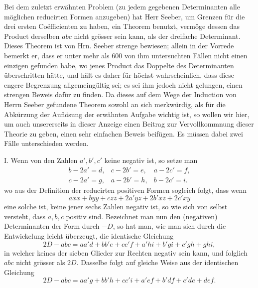 \documentclass[12pt]{article}
\begin{document}
Bei dem zuletzt erwähnten Problem (zu jedem gegebenen Determinanten alle möglichen reducirten Formen anzugeben) hat Herr Seeber, um Grenzen für die drei ersten Coëfficienten zu haben, ein Theorem benutzt, vermöge dessen das Product derselben $abc$ nicht grösser sein kann, als der dreifache Determinant. Dieses Theorem ist von Hrn. Seeber strenge bewiesen; allein in der Vorrede bemerkt er, dass er unter mehr als 600 von ihm untersuchten Fällen nicht einen einzigen gefunden habe, wo jenes Product das Doppelte des Determinanten überschritten hätte, und hält es daher für höchst wahrscheinlich, dass diese engere Begrenzung allgemeingültig sei; es sei ihm jedoch nicht gelungen, einen strengen Beweis dafür zu finden. Da dieses auf dem Wege der Induction von Herrn Seeber gefundene Theorem sowohl an sich merkwürdig, als für die Abkürzung der Auflösung der erwähnten Aufgabe wichtig ist, so wollen wir hier, um auch unsererseits in dieser Anzeige einen Beitrag zur Vervollkommnung dieser Theorie zu geben, einen sehr einfachen Beweis beifügen. Es müssen dabei zwei Fälle unterschieden werden.

I. Wenn von den Zahlen $a',b',c'$ keine negativ ist, so setze man
\[
\begin{array}{lll}
b-2a'=d, & c-2b'=e, & a-2c'=f,\\
c-2a'=g, & a-2b'=h, & b-2c'=i.
\end{array}
\]
wo aus der Definition der reducirten positiven Formen sogleich folgt, dass wenn
\[
axx+byy+czz+2a'yz+2b'xz+2c'xy
\]
eine solche ist, keine jener sechs Zahlen negativ ist, so wie sich von selbst versteht, dass $a,b,c$ positiv sind. Bezeichnet man nun den (negativen) Determinanten der Form durch $-D$, so hat man, wie man sich durch die Entwickelung leicht überzeugt, die identische Gleichung
\[
2D-abc=aa'd+bb'e+cc'f+a'hi+b'gi+c'gh+ghi,
\]
in welcher keines der sieben Glieder zur Rechten negativ sein kann, und folglich $abc$ nicht grösser als $2D$. Dasselbe folgt auf gleiche Weise aus der identischen Gleichung
\[
2D-abc=aa'g+bb'h+cc'i+a'ef+b'df+c'de+def.
\]
\end{document}
